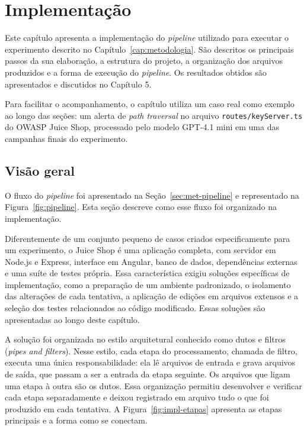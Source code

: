 \chapter[Implementação]{Implementação}
\label{cap:implementacao}

Este capítulo apresenta a implementação do \textit{pipeline} utilizado para executar o experimento descrito no Capítulo~\ref{cap:metodologia}. São descritos os principais passos da sua elaboração, a estrutura do projeto, a organização dos arquivos produzidos e a forma de execução do \textit{pipeline}. Os resultados obtidos são apresentados e discutidos no Capítulo 5.

Para facilitar o acompanhamento, o capítulo utiliza um caso real como exemplo ao longo das seções: um alerta de \textit{path traversal} no arquivo \texttt{routes/keyServer.ts} do OWASP Juice Shop, processado pelo modelo GPT-4.1 mini em uma das campanhas finais do experimento.

\section{Visão geral}
\label{sec:impl-visao}

O fluxo do \textit{pipeline} foi apresentado na Seção~\ref{sec:met-pipeline} e representado na Figura~\ref{fig:pipeline}. Esta seção descreve como esse fluxo foi organizado na implementação.

Diferentemente de um conjunto pequeno de casos criados especificamente para um experimento, o Juice Shop é uma aplicação completa, com servidor em Node.js e Express, interface em Angular, banco de dados, dependências externas e uma suíte de testes própria. Essa característica exigiu soluções específicas de implementação, como a preparação de um ambiente padronizado, o isolamento das alterações de cada tentativa, a aplicação de edições em arquivos extensos e a seleção dos testes relacionados ao código modificado. Essas soluções são apresentadas ao longo deste capítulo.

A solução foi organizada no estilo arquitetural conhecido como dutos e filtros (\textit{pipes and filters}). Nesse estilo, cada etapa do processamento, chamada de filtro, executa uma única responsabilidade: ela lê arquivos de entrada e grava arquivos de saída, que passam a ser a entrada da etapa seguinte. Os arquivos que ligam uma etapa à outra são os dutos. Essa organização permitiu desenvolver e verificar cada etapa separadamente e deixou registrado em arquivo tudo o que foi produzido em cada tentativa. A Figura~\ref{fig:impl-etapas} apresenta as etapas principais e a forma como se conectam.

